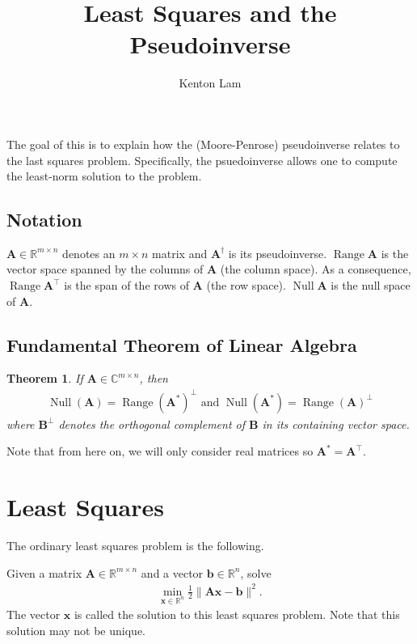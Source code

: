 \documentclass[12pt,a4paper]{article} %
\title{Least Squares and the Pseudoinverse}
\author{Kenton Lam}
\newtheorem*{theorem}{Theorem}
\DeclareMathOperator{\Range}{Range}
\DeclareMathOperator{\Null}{Null}
\begin{document}
\maketitle

The goal of this is to explain how the (Moore-Penrose) pseudoinverse relates 
to the last squares problem. Specifically, the psuedoinverse allows one to 
compute the least-norm solution to the problem.

\subsection*{Notation}
$\mathbf A \in \mathbb R^{m \times n}$ denotes an $m \times n$ matrix 
and $\mathbf A^\dagger$ is its pseudoinverse. $\Range \mathbf A$ is the vector space 
spanned by the columns of $\mathbf A$ (the column space). As a consequence, $\Range \mathbf A^\top$ is 
the span of the rows of $\mathbf A$ (the row space). $\Null \mathbf A$ is the null space of $\mathbf A$.

\subsection*{Fundamental Theorem of Linear Algebra}
\begin{theorem}
    If $\mathbf A \in \mathbb C^{m \times n}$, then 
    \begin{align*}
        \Null (\mathbf A) = \Range (\mathbf A^*)^\perp \text{ and }
        \Null (\mathbf A^*) = \Range(\mathbf A)^\perp
    \end{align*}
    where $\mathbf B^\perp$ denotes the orthogonal complement of $\mathbf B$ in its 
    containing vector space.
\end{theorem}
Note that from here on, we will only consider real matrices so $\mathbf A^* = \mathbf A^\top$.

\section{Least Squares}
The ordinary least squares problem is the following.

Given a matrix $\mathbf A \in \mathbb R^{m \times n}$ 
and a vector $\bm b \in \mathbb R^{n}$, solve
\begin{align*}
    \min_{\bm x \in \mathbb R^n} \frac{1}{2} \| \mathbf A \bm x - \bm b \| ^2.
\end{align*}
The vector $\bm x$ is called the solution to this least squares problem. Note that this 
solution may not be unique.
\end{document}
